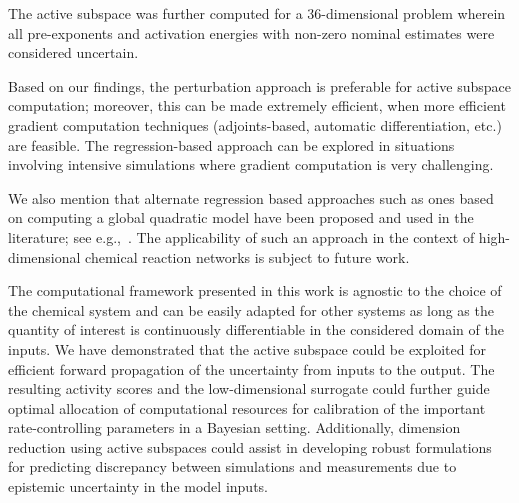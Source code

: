The active subspace was further computed for a 36-dimensional problem
wherein all pre-exponents and activation energies with non-zero nominal
estimates  were considered uncertain. 

Based on our findings, the perturbation approach is preferable for active
subspace computation; moreover, this can be made extremely efficient, when more
efficient gradient computation techniques (adjoints-based, automatic
differentiation, etc.) are feasible. The regression-based approach can be
explored in situations involving intensive simulations where gradient
computation is very challenging. 

%
%
We also mention that alternate regression based approaches such as ones based
on computing a global quadratic model have been proposed and used in the
literature; see e.g.,~\cite{Constantine:2017a}.  The applicability of such an
approach in the context of high-dimensional chemical reaction networks is
subject to future work. 

The computational framework presented in this work is agnostic to the choice of
the chemical system and can be easily adapted for other systems as long as the
quantity of interest is continuously differentiable in the considered domain of
the inputs.  We have demonstrated that the active subspace could be exploited
for efficient forward propagation of the uncertainty from inputs to the output.
The resulting activity scores and the low-dimensional surrogate could further
guide optimal allocation of computational resources for calibration of the
important rate-controlling parameters  in a
Bayesian setting.  Additionally, dimension reduction using active subspaces
could assist in developing robust formulations for predicting discrepancy
between simulations and measurements due to epistemic uncertainty in the model
inputs.
